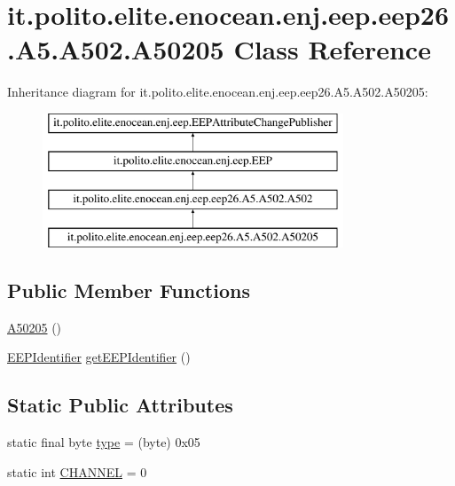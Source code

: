 \hypertarget{classit_1_1polito_1_1elite_1_1enocean_1_1enj_1_1eep_1_1eep26_1_1_a5_1_1_a502_1_1_a50205}{}\section{it.\+polito.\+elite.\+enocean.\+enj.\+eep.\+eep26.\+A5.\+A502.\+A50205 Class Reference}
\label{classit_1_1polito_1_1elite_1_1enocean_1_1enj_1_1eep_1_1eep26_1_1_a5_1_1_a502_1_1_a50205}
Inheritance diagram for it.\+polito.\+elite.\+enocean.\+enj.\+eep.\+eep26.\+A5.\+A502.\+A50205\+:\begin{figure}[H]
\begin{center}
\leavevmode
\includegraphics[height=4.000000cm]{classit_1_1polito_1_1elite_1_1enocean_1_1enj_1_1eep_1_1eep26_1_1_a5_1_1_a502_1_1_a50205}
\end{center}
\end{figure}
\subsection*{Public Member Functions}
\begin{DoxyCompactItemize}
\item 
\hyperlink{classit_1_1polito_1_1elite_1_1enocean_1_1enj_1_1eep_1_1eep26_1_1_a5_1_1_a502_1_1_a50205_a2fbaec176468e07324058a5de39abc7e}{A50205} ()
\item 
\hyperlink{classit_1_1polito_1_1elite_1_1enocean_1_1enj_1_1eep_1_1_e_e_p_identifier}{E\+E\+P\+Identifier} \hyperlink{classit_1_1polito_1_1elite_1_1enocean_1_1enj_1_1eep_1_1eep26_1_1_a5_1_1_a502_1_1_a50205_ac766b68acfd3b0f6b63f88589c6b0361}{get\+E\+E\+P\+Identifier} ()
\end{DoxyCompactItemize}
\subsection*{Static Public Attributes}
\begin{DoxyCompactItemize}
\item 
static final byte \hyperlink{classit_1_1polito_1_1elite_1_1enocean_1_1enj_1_1eep_1_1eep26_1_1_a5_1_1_a502_1_1_a50205_a68ceec62d912505f59a74513ce819e6f}{type} = (byte) 0x05
\item 
static int \hyperlink{classit_1_1polito_1_1elite_1_1enocean_1_1enj_1_1eep_1_1eep26_1_1_a5_1_1_a502_1_1_a50205_adc9305fee441b508ddf8a06c34bd79c2}{C\+H\+A\+N\+N\+EL} = 0
\end{DoxyCompactItemize}
